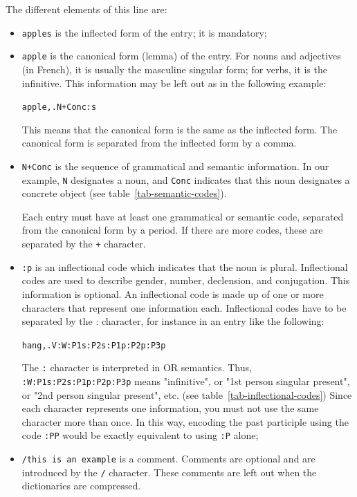 \bigskip
\noindent The different elements of this line are:

\bigskip
\begin{itemize}
  \item \verb+apples+ is the inflected form of the entry; it is mandatory;
  
  \bigskip \item \verb+apple+ is the canonical form (lemma) of the
  entry. For nouns and adjectives (in French), it is usually the
  masculine singular form; for verbs, it is the infinitive. This information may
  be left out as in the following example:
  
  \bigskip
  \verb$apple,.N+Conc:s$
  
  \bigskip This means that the canonical form is the same as the inflected form.
  The canonical form is separated from the inflected form by a
  comma.\index{\verb+,+}
  
  \bigskip \item \verb$N+Conc$ is the sequence of grammatical and semantic
  information.  In our
  example, \verb+N+ designates a noun, and \verb+Conc+ indicates that this noun
  designates a concrete object (see table~\ref{tab-semantic-codes}).
  
  Each entry must have at least one grammatical or semantic code, separated from
  the canonical form by a period. If there are more codes, these are separated by
  the \verb$+$\index{\verb$+$} character.
  
  \bigskip \item \verb+:p+ is an inflectional code which indicates that the noun
  is  plural. Inflectional codes are used to
  describe gender, number, declension, and conjugation. This information is
  optional. An inflectional code is made up of one or more characters that
  represent one information each. Inflectional codes have to be separated by the
  : character, for instance in an entry like the following:
  
  \verb+hang,.V:W:P1s:P2s:P1p:P2p:P3p+
  
  The \verb+:+ character is interpreted in OR semantics. Thus,
  \verb+:W:P1s:P2s:P1p:P2p:P3p+ means "infinitive", or "1st person singular
  present", or "2nd person singular present", etc. (see
  table~\ref{tab-inflectional-codes}) Since each character
  represents one information, you must not use the same character
  more than once. In this way, encoding the past participle using the code \verb+:PP+ would be
  exactly equivalent to using \verb+:P+ alone;\index{\verb+:+}
  
  \bigskip \item \verb+/this is an example+ is a comment. Comments are optional
  and are introduced by the \verb+/+ character. These comments are left out when
  the dictionaries are compressed. 
   \index{\verb+/+}
\end{itemize}

